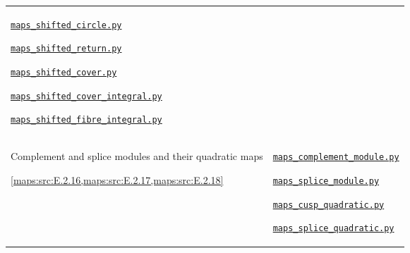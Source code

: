 \begin{longtable}{@{}p{}p{}@{}}
\href{https://github.com/KokunoYumeto/s6-complex-structure-workbench/blob/\SsixRepositoryCommit/pro_returns/S6_10_PAPERS_checkpoint_15_20261119T1045Z/S6_10_PAPERS/code/V/replay_chains/code/maps_shifted_circle.py}{\nolinkurl{maps_shifted_circle.py}}\par \href{https://github.com/KokunoYumeto/s6-complex-structure-workbench/blob/\SsixRepositoryCommit/pro_returns/S6_10_PAPERS_checkpoint_15_20261119T1045Z/S6_10_PAPERS/code/V/replay_chains/code/maps_shifted_return.py}{\nolinkurl{maps_shifted_return.py}}\par \href{https://github.com/KokunoYumeto/s6-complex-structure-workbench/blob/\SsixRepositoryCommit/pro_returns/S6_10_PAPERS_checkpoint_15_20261119T1045Z/S6_10_PAPERS/code/V/replay_chains/code/maps_shifted_cover.py}{\nolinkurl{maps_shifted_cover.py}}\par \href{https://github.com/KokunoYumeto/s6-complex-structure-workbench/blob/\SsixRepositoryCommit/pro_returns/S6_10_PAPERS_checkpoint_15_20261119T1045Z/S6_10_PAPERS/code/V/replay_chains/code/maps_shifted_cover_integral.py}{\nolinkurl{maps_shifted_cover_integral.py}}\par \href{https://github.com/KokunoYumeto/s6-complex-structure-workbench/blob/\SsixRepositoryCommit/pro_returns/S6_10_PAPERS_checkpoint_15_20261119T1045Z/S6_10_PAPERS/code/V/replay_chains/code/maps_shifted_fibre_integral.py}{\nolinkurl{maps_shifted_fibre_integral.py}} \\[3pt]
\hypertarget{prog:V:quadratic}{}Complement and splice modules and their quadratic maps\par \cref{maps:src:E.2.16,maps:src:E.2.17,maps:src:E.2.18} &
\href{https://github.com/KokunoYumeto/s6-complex-structure-workbench/blob/\SsixRepositoryCommit/pro_returns/S6_10_PAPERS_checkpoint_15_20261119T1045Z/S6_10_PAPERS/code/V/replay_chains/code/maps_complement_module.py}{\nolinkurl{maps_complement_module.py}}\par \href{https://github.com/KokunoYumeto/s6-complex-structure-workbench/blob/\SsixRepositoryCommit/pro_returns/S6_10_PAPERS_checkpoint_15_20261119T1045Z/S6_10_PAPERS/code/III/maps_splice_module.py}{\nolinkurl{maps_splice_module.py}}\par \href{https://github.com/KokunoYumeto/s6-complex-structure-workbench/blob/\SsixRepositoryCommit/pro_returns/S6_10_PAPERS_checkpoint_15_20261119T1045Z/S6_10_PAPERS/code/III/maps_cusp_quadratic.py}{\nolinkurl{maps_cusp_quadratic.py}}\par \href{https://github.com/KokunoYumeto/s6-complex-structure-workbench/blob/\SsixRepositoryCommit/pro_returns/S6_10_PAPERS_checkpoint_15_20261119T1045Z/S6_10_PAPERS/code/III/maps_splice_quadratic.py}{\nolinkurl{maps_splice_quadratic.py}} \\[3pt]

\end{longtable}
